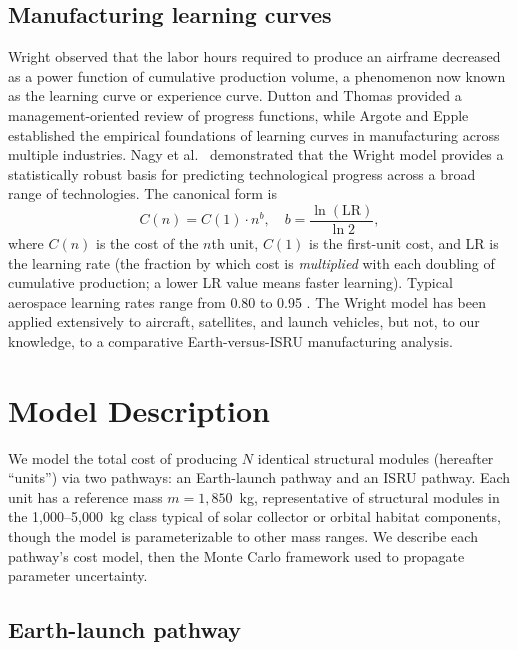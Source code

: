 \documentclass[preprint,12pt]{elsarticle}
\begin{document}
\subsection{Manufacturing learning curves}

Wright \cite{wright1936} observed that the labor hours required to produce an airframe decreased as a power function of cumulative production volume, a phenomenon now known as the learning curve or experience curve. Dutton and Thomas \cite{dutton1984} provided a management-oriented review of progress functions, while Argote and Epple \cite{argote1990} established the empirical foundations of learning curves in manufacturing across multiple industries. Nagy et al.\ \cite{nagy2013} demonstrated that the Wright model provides a statistically robust basis for predicting technological progress across a broad range of technologies. The canonical form is
\begin{equation}
  C(n) = C(1) \cdot n^{b}, \quad b = \frac{\ln(\text{LR})}{\ln 2},
  \label{eq:wright}
\end{equation}
where $C(n)$ is the cost of the $n$th unit, $C(1)$ is the first-unit cost, and LR is the learning rate (the fraction by which cost is \emph{multiplied} with each doubling of cumulative production; a lower LR value means faster learning). Typical aerospace learning rates range from 0.80 to 0.95 \cite{wertz2011}. The Wright model has been applied extensively to aircraft, satellites, and launch vehicles, but not, to our knowledge, to a comparative Earth-versus-ISRU manufacturing analysis.

\section{Model Description}
\label{sec:model}

We model the total cost of producing $N$ identical structural modules (hereafter ``units'') via two pathways: an Earth-launch pathway and an ISRU pathway. Each unit has a reference mass $m = 1{,}850$~kg, representative of structural modules in the 1{,}000--5{,}000~kg class typical of solar collector or orbital habitat components, though the model is parameterizable to other mass ranges. We describe each pathway's cost model, then the Monte Carlo framework used to propagate parameter uncertainty.

\subsection{Earth-launch pathway}
\end{document}
